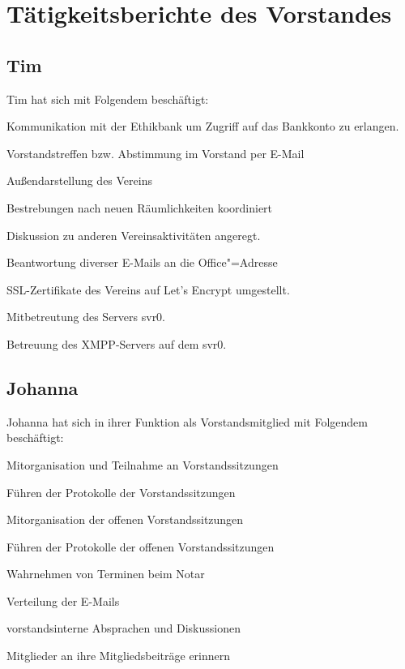 \documentclass[ngerman]{scrartcl}
\begin{document}
\section{Tätigkeitsberichte des Vorstandes}

\subsection{Tim}

Tim hat sich mit Folgendem beschäftigt:

\begin{compactitem}
\item Kommunikation mit der Ethikbank um Zugriff auf das Bankkonto zu erlangen.  
\item Vorstandstreffen bzw. Abstimmung im Vorstand per E-Mail
\item Außendarstellung des Vereins
\item Bestrebungen nach neuen Räumlichkeiten koordiniert 
\item Diskussion zu anderen Vereinsaktivitäten angeregt.
\item Beantwortung diverser E-Mails an die Office"=Adresse
\item SSL-Zertifikate des Vereins auf Let's Encrypt umgestellt.
\item Mitbetreutung des Servers svr0.
\item Betreuung des XMPP-Servers auf dem svr0.
\end{compactitem}

\subsection{Johanna}

Johanna hat sich in ihrer Funktion als Vorstandsmitglied mit Folgendem 
beschäftigt:

\begin{compactitem}
    \item Mitorganisation und Teilnahme an Vorstandssitzungen
    \item Führen der Protokolle der Vorstandssitzungen
    \item Mitorganisation der offenen Vorstandssitzungen
    \item Führen der Protokolle der offenen Vorstandssitzungen
    \item Wahrnehmen von Terminen beim Notar
    \item Verteilung der E-Mails
    \item vorstandsinterne Absprachen und Diskussionen 
    \item Mitglieder an ihre Mitgliedsbeiträge erinnern
\end{compactitem}
\end{document}
